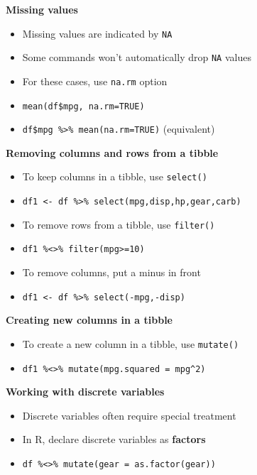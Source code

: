 \documentclass[10pt,landscape]{article}
\begin{document}
\begin{multicols}{3}
\smallskip{}

\textbf{Missing values}\\
\begin{itemize}
    \item Missing values are indicated by \verb!NA!
    \item Some commands won't automatically drop \verb!NA! values
    \item For these cases, use \verb!na.rm! option
    \item[] \verb!mean(df$mpg, na.rm=TRUE)!
    \item[] \verb!df$mpg %>% mean(na.rm=TRUE)! (equivalent)
\end{itemize}

\smallskip{}

\textbf{Removing columns and rows from a tibble}\\
\begin{itemize}
    \item To keep columns in a tibble, use \verb!select()!
    \item[] \verb!df1 <- df %>% select(mpg,disp,hp,gear,carb)!
    \item To remove rows from a tibble, use \verb!filter()!
    \item[] \verb!df1 %<>% filter(mpg>=10)!
    \item To remove columns, put a minus in front
    \item[] \verb!df1 <- df %>% select(-mpg,-disp)!
\end{itemize}

\smallskip{}

\textbf{Creating new columns in a tibble}\\
\begin{itemize}
    \item To create a new column in a tibble, use \verb!mutate()!
    \item[] \verb!df1 %<>% mutate(mpg.squared = mpg^2)!
\end{itemize}

\smallskip{}

\textbf{Working with discrete variables}\\
\begin{itemize}
    \item Discrete variables often require special treatment
    \item In R, declare discrete variables as \textbf{factors}
    \item[] \verb!df %<>% mutate(gear = as.factor(gear))!
\end{itemize}


\end{multicols}
\end{document}
